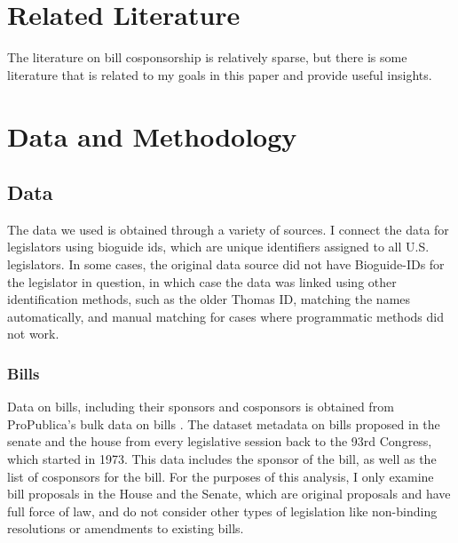 \documentclass{article}
\begin{document}
\section{Related Literature}
The literature on bill cosponsorship is relatively sparse, but there is some literature that is related to my goals in this paper and provide useful insights. \reminder


\section{Data and Methodology}
\subsection{Data} 
The data we used is obtained through a variety of sources. I connect the data for legislators using bioguide ids, which are unique identifiers assigned to all U.S. legislators. In some cases, the original data source did not have Bioguide-IDs for the legislator in question, in which case the data was linked using other identification methods, such as the older Thomas ID, matching the names automatically, and manual matching for cases where programmatic methods did not work. 

\subsubsection{Bills}
Data on bills, including their sponsors and cosponsors is obtained from ProPublica's bulk data on bills \cite{propublica}. The dataset metadata on bills proposed in the senate and the house from every legislative session back to the 93rd Congress, which started in 1973. This data includes the sponsor of the bill, as well as the list of cosponsors for the bill. For the purposes of this analysis, I only examine bill proposals in the House and the Senate, which are original proposals and have full force of law, and do not consider other types of legislation like non-binding resolutions or amendments to existing bills. 
\end{document}
